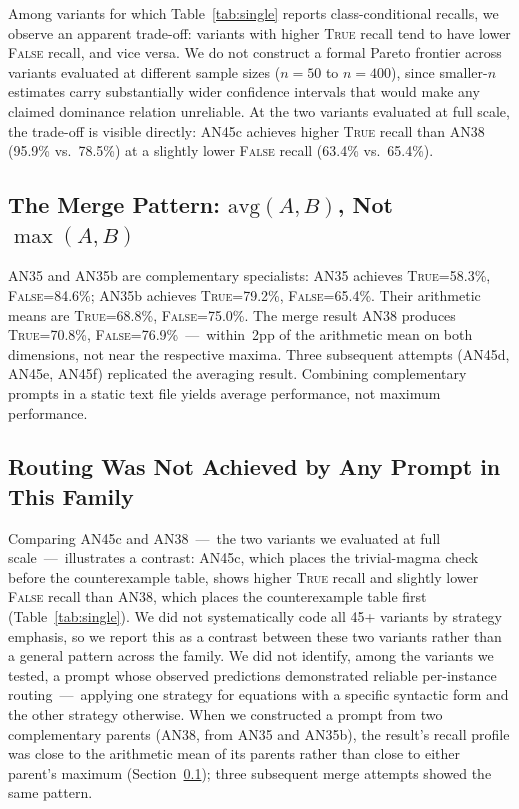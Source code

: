 \documentclass[11pt]{article}
\begin{document}
Among variants for which Table~\ref{tab:single} reports
class-conditional recalls, we observe an apparent trade-off: variants
with higher \textsc{True} recall tend to have lower \textsc{False}
recall, and vice versa. We do not construct a formal Pareto frontier
across variants evaluated at different sample sizes ($n=50$ to
$n=400$), since smaller-$n$ estimates carry substantially wider
confidence intervals that would make any claimed dominance relation
unreliable. At the two variants evaluated at full scale, the trade-off
is visible directly: AN45c achieves higher \textsc{True} recall than
AN38 (95.9\% vs.\ 78.5\%) at a slightly lower \textsc{False} recall
(63.4\% vs.\ 65.4\%).

\subsection{The Merge Pattern: $\mathrm{avg}(A,B)$, Not $\max(A,B)$}
\label{sec:mergepattern}

AN35 and AN35b are complementary specialists: AN35 achieves
\textsc{True}=58.3\%, \textsc{False}=84.6\%; AN35b achieves
\textsc{True}=79.2\%, \textsc{False}=65.4\%. Their arithmetic means
are \textsc{True}=68.8\%, \textsc{False}=75.0\%. The merge result AN38
produces \textsc{True}=70.8\%, \textsc{False}=76.9\%~---~within~2pp
of the arithmetic mean on both dimensions, not near the respective
maxima. Three subsequent attempts (AN45d, AN45e, AN45f) replicated the
averaging result. Combining complementary prompts in a static text file
yields average performance, not maximum performance.

\subsection{Routing Was Not Achieved by Any Prompt in This Family}

Comparing AN45c and AN38~---~the two variants we evaluated at full
scale~---~illustrates a contrast: AN45c, which places the trivial-magma
check before the counterexample table, shows higher \textsc{True}
recall and slightly lower \textsc{False} recall than AN38, which
places the counterexample table first (Table~\ref{tab:single}). We did
not systematically code all 45+ variants by strategy emphasis, so we
report this as a contrast between these two variants rather than a
general pattern across the family. We did not identify, among the
variants we tested, a prompt whose observed predictions demonstrated
reliable per-instance routing~---~applying one strategy for equations
with a specific syntactic form and the other strategy otherwise. When
we constructed a prompt from two complementary parents (AN38, from
AN35 and AN35b), the result's recall profile was close to the
arithmetic mean of its parents rather than close to either parent's
maximum (Section~\ref{sec:mergepattern}); three subsequent merge
attempts showed the same pattern.
\end{document}
